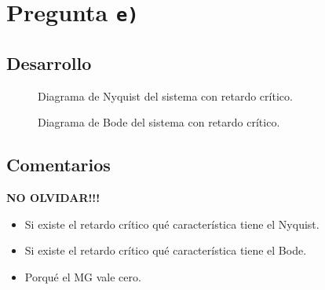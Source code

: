 \section{Pregunta \texttt{e)}}\label{pregunta-e}


\subsection{Desarrollo}

\begin{figure}[h]
  \centering
  
  \caption{Diagrama de Nyquist del sistema con retardo crítico.}
  \label{fig:nyquist-e}
\end{figure}

\begin{figure}[h]
  \centering
  
  \caption{Diagrama de Bode del sistema con retardo crítico.}
  \label{fig:bode-e}
\end{figure}


\FloatBarrier
\subsection{Comentarios}

\textbf{NO OLVIDAR!!!}


\begin{itemize}
  \item Si existe el retardo crítico qué característica tiene el Nyquist.
  \item Si existe el retardo crítico qué característica tiene el Bode.
  \item Porqué el MG vale cero.
\end{itemize}


